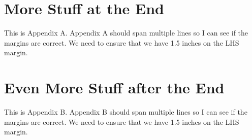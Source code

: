 \documentclass[11pt,ms]{uddissert2019}
\begin{document}
\begin{appendices}
	\appendix
	
    \chapter{More Stuff at the End}

    This is Appendix A.  Appendix A should span multiple lines so I can see if the margins are correct.  We need to ensure that we have 1.5 inches on the LHS margin.

    \chapter{Even More Stuff after the End}

    This is Appendix B.  Appendix B should span multiple lines so I can see if the margins are correct.  We need to ensure that we have 1.5 inches on the LHS margin.

\end{appendices}
\end{document}
